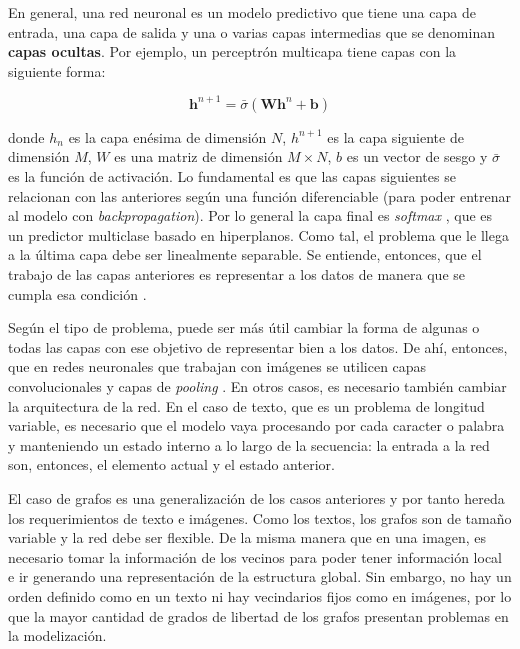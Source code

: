 \documentclass[
    left=2.0cm,         %
    right=2.0cm,        %
    top=2.0cm,          %
    bottom=2.5cm,         %
    bindingoffset=6mm,  %
    nohyphenation=false %
]{eiti/eiti-thesis}
\begin{document}
En general, una red neuronal es un modelo predictivo que tiene una capa de entrada, %
una capa de salida y una o varias capas intermedias que se denominan \textbf{capas
ocultas}. Por ejemplo, un perceptrón multicapa tiene capas con la siguiente forma:

\begingroup
 $$\mathbf{h}^{n+1} = \bar{\sigma}(\mathbf{W h}^{n} + \mathbf{b})$$
\endgroup


donde $h_n$ es la capa enésima de dimensión $N$, $h^{n+1}$ es la capa siguiente de
dimensión $M$, $W$ es una matriz de dimensión $M\times N$, $b$ es un vector de
sesgo y $\bar\sigma$ es la función de activación. Lo fundamental es que las
capas siguientes se relacionan con las anteriores según una función diferenciable
(para poder entrenar al modelo con \textit{backpropagation}). Por lo general la
capa final es \textit{softmax} \cite{sfunsupervised}, que es un predictor 
multiclase basado en hiperplanos.
Como tal, el problema que le llega a la última capa debe ser linealmente separable.
Se entiende, entonces, que el trabajo de las capas anteriores es representar a los
datos de manera que se cumpla esa condición \cite{nielsen2015neural}. %

Según el tipo de problema, puede ser más útil cambiar la forma de algunas o todas
las capas con ese objetivo de representar bien a los datos. De ahí, entonces, que
en redes neuronales que trabajan con imágenes se utilicen capas convolucionales 
y capas de \textit{pooling} \cite{alexnet}. En otros casos, es necesario también cambiar la
arquitectura de la red. En el caso de texto, que es un problema de longitud variable,
es necesario que el modelo vaya procesando por cada caracter o palabra y manteniendo
un estado interno a lo largo de la secuencia: la entrada a la red son, entonces,
el elemento actual y el estado anterior. %

El caso de grafos es una generalización de los casos anteriores y por tanto hereda
los requerimientos de texto e imágenes. Como los textos, los grafos son de tamaño
variable y la red debe ser flexible. %
De la misma manera que en una imagen, es necesario tomar la información de los
vecinos para poder tener información local e ir generando una representación
de la estructura global. Sin embargo, no hay un orden definido como en un texto
ni hay vecindarios fijos como en imágenes, por lo que la mayor cantidad de grados
de libertad de los grafos presentan problemas en la modelización.
\end{document}

